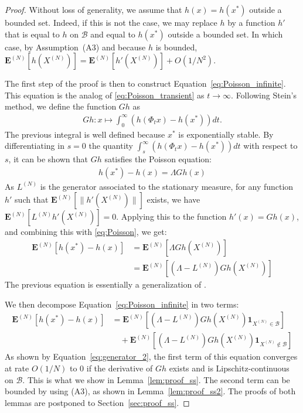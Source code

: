 \documentclass[sigconf]{acmart}
\newcommand\XN{X^{(N)}}
\newcommand\LN{L^{(N)}}
\newcommand\calB{\mathcal{B}}
\newcommand\espN[1]{\mathbf{E}^{(N)}\left[#1\right]}
\newcommand\sespN[1]{\mathbf{E}^{(N)}[#1]}
\newcommand\snorm[1]{\|#1\|}
\newcommand\p[1]{\left(#1\right)}
\begin{document}
\begin{proof}
  Without loss of generality, we assume that $h(x)=h(x^*)$ outside a
  bounded set. Indeed, if this is not the case, we may replace $h$ by
  a function $h'$ that is equal to $h$ on $\calB$ and equal to
  $h(x^*)$ outside a bounded set. In which case, by Assumption~(A3)
  and because $h$ is bounded,
  $\sespN{h(\XN)} = \sespN{h'(\XN)}+O(1/N^2)$.
  
  The first step of the proof is then to construct
  Equation~\eqref{eq:Poisson_infinite}. This equation is the analog of
  \eqref{eq:Poisson_transient} as $t\to\infty$. Following Stein's
  method, we define the function $Gh$ as
  \begin{align*}
    Gh : x\mapsto \int_0^\infty \p{h(\Phi_t x)-h(x^*)}dt. 
  \end{align*}
  The previous integral is well defined because $x^*$ is exponentially
  stable. By differentiating in $s=0$ the quantity
  $\int_s^\infty \p{h(\Phi_t x)-h(x^*)}dt$ with respect to $s$, it can
  be shown that $Gh$ satisfies the Poisson equation:
  \begin{align}
    h(x^*)-h(x) = \Lambda Gh(x)
    \label{eq:Poisson}
  \end{align}
  As $\LN$
  is the generator associated to the stationary measure, for any
  function $h'$
  such that $\sespN{\snorm{h'(\XN)}}$
  exists, we have $\sespN{\LN
    h'(\XN) }=0$.  Applying this to the function $h'(x)=G
  h(x)$, and combining this with \eqref{eq:Poisson}, we get:
\begin{align}
  \espN{h(x^*)-h(x)} &= \espN{\Lambda Gh(\XN)}\nonumber\\
                     &=\espN{(\Lambda-\LN)Gh(\XN)}
      \label{eq:Poisson_infinite}
\end{align}
The previous equation is essentially a generalization of
\cite[Equation~(4) and Equation~(7)]{ying2016rate}.

We then decompose Equation~\eqref{eq:Poisson_infinite} in two terms:
\begin{align*}
  \espN{h(x^*)-h(x)}
  &=\espN{(\Lambda-\LN)Gh(\XN)\mathbf{1}_{\XN\in\calB}}\\
  &\quad +\espN{(\Lambda-\LN)Gh(\XN)\mathbf{1}_{\XN\not\in\calB}}
\end{align*}
As shown by Equation~\eqref{eq:generator_2}, the first term of this
equation converges at rate $O(1/N)$
to $0$
if the derivative of $Gh$
exists and is Lipschitz-continuous on $\calB$.
This is what we show in Lemma~\ref{lem:proof_ss}. The second term can
be bounded by using (A3), as shown in Lemma~\ref{lem:proof_ss2}.  The
proofs of both lemmas are postponed to Section~\ref{sec:proof_ss}.
\end{proof}
\end{document}
